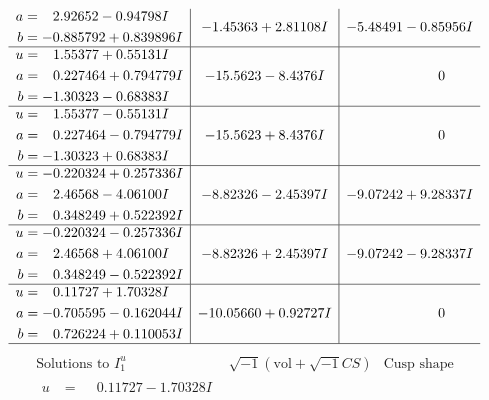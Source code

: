\documentclass[1p]{elsarticle_modified}
\theoremstyle{definition}
\newcommand{\I}{\sqrt{-1}}
\begin{document}
$$\begin{array}{c|c|c}
\begin{aligned}
a &= \phantom{-}2.92652 - 0.94798 I \\
b &= -0.885792 + 0.839896 I\end{aligned}
 & -1.45363 + 2.81108 I & -5.48491 - 0.85956 I \\ \hline\begin{aligned}
u &= \phantom{-}1.55377 + 0.55131 I \\
a &= \phantom{-}0.227464 + 0.794779 I \\
b &= -1.30323 - 0.68383 I\end{aligned}
 & -15.5623 - 8.4376 I & \phantom{-0.000000 } 0 \\ \hline\begin{aligned}
u &= \phantom{-}1.55377 - 0.55131 I \\
a &= \phantom{-}0.227464 - 0.794779 I \\
b &= -1.30323 + 0.68383 I\end{aligned}
 & -15.5623 + 8.4376 I & \phantom{-0.000000 } 0 \\ \hline\begin{aligned}
u &= -0.220324 + 0.257336 I \\
a &= \phantom{-}2.46568 - 4.06100 I \\
b &= \phantom{-}0.348249 + 0.522392 I\end{aligned}
 & -8.82326 - 2.45397 I & -9.07242 + 9.28337 I \\ \hline\begin{aligned}
u &= -0.220324 - 0.257336 I \\
a &= \phantom{-}2.46568 + 4.06100 I \\
b &= \phantom{-}0.348249 - 0.522392 I\end{aligned}
 & -8.82326 + 2.45397 I & -9.07242 - 9.28337 I \\ \hline\begin{aligned}
u &= \phantom{-}0.11727 + 1.70328 I \\
a &= -0.705595 - 0.162044 I \\
b &= \phantom{-}0.726224 + 0.110053 I\end{aligned}
 & -10.05660 + 0.92727 I & \phantom{-0.000000 } 0\\
 \hline 
 \end{array}$$\newpage$$\begin{array}{c|c|c}  
\text{Solutions to }I^u_{1}& \I (\text{vol} + \sqrt{-1}CS) & \text{Cusp shape}\\
 \hline 
\begin{aligned}
u &= \phantom{-}0.11727 - 1.70328 I \\

\end{aligned}
\end{array}$$
\end{document}
